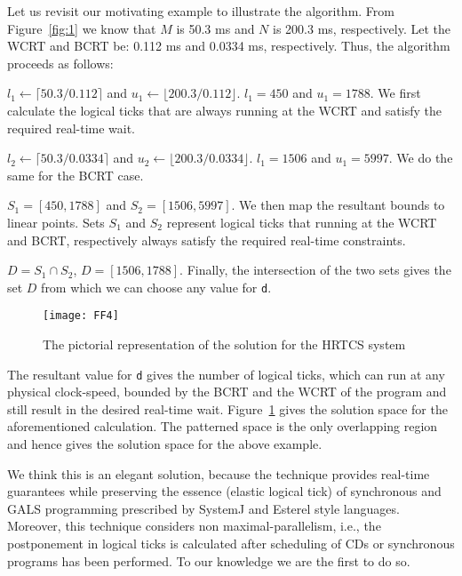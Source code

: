 Let us revisit our motivating example to illustrate the algorithm. From
Figure~\ref{fig:1} we know that $M$ is 50.3 ms and $N$ is 200.3 ms,
respectively. Let the WCRT and BCRT be: 0.112 ms and 0.0334 ms,
respectively. Thus, the algorithm proceeds as follows:

\begin{enumerate*}
\item $l_1 \leftarrow \lceil 50.3/0.112 \rceil$ and $u_1 \leftarrow
  \lfloor 200.3/0.112 \rfloor$. $l_1 = 450$ and $u_1 = 1788$. We first
  calculate the logical ticks that are always running at the WCRT and
  satisfy the required real-time wait.
\item $l_2 \leftarrow \lceil 50.3/0.0334 \rceil$ and $u_2 \leftarrow
  \lfloor 200.3/0.0334 \rfloor$. $l_1 = 1506$ and $u_1 = 5997$. We do
  the same for the BCRT case.
\item $S_1 = [450,1788]$ and $S_2 =[1506,5997]$. We then map the
  resultant bounds to linear points. Sets $S_1$ and $S_2$ represent
  logical ticks that running at the WCRT and BCRT, respectively always
  satisfy the required real-time constraints.
\item $D = S_1 \cap S_2$, $D = [1506,1788]$. Finally, the intersection
  of the two sets gives the set $D$ from which we can choose any value
  for \texttt{d}.
\end{enumerate*}

\begin{figure}[t!]
  \centering
  \texttt{[image: FF4]}
  \caption{The pictorial representation of the solution for the HRTCS system}
  \label{fig:hrtcssoln}
\end{figure}

The resultant value for \texttt{d} gives the number of logical ticks,
which can run at any physical clock-speed, bounded by the BCRT and the
WCRT of the program and still result in the desired real-time
wait. Figure~\ref{fig:hrtcssoln} gives the solution space for the
aforementioned calculation. The patterned space is the only overlapping
region and hence gives the solution space for the above example.

We think this is an elegant solution, because the technique provides
real-time guarantees while preserving the essence (elastic logical tick)
of synchronous and GALS programming prescribed by SystemJ and Esterel
style languages. Moreover, this technique considers non
maximal-parallelism, i.e., the postponement in logical ticks is
calculated after scheduling of CDs or synchronous programs has been
performed. To our knowledge we are the first to do so.

